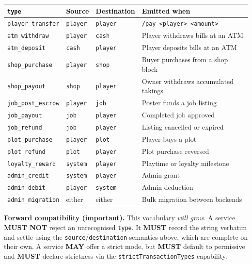 \documentclass[11pt,a4paper]{article}
\newcommand{\code}[1]{\texttt{\small #1}}
\newcommand{\req}{\textbf{MUST}}
\newcommand{\opt}{\textbf{MAY}}
\newcommand{\keybox}[2]{%
  \par\vspace{0.5em}\noindent
  \colorbox{#1}{%
    \begin{minipage}{\dimexpr\linewidth-2\fboxsep\relax}
    \vspace{0.35em}\small #2\vspace{0.35em}
    \end{minipage}}%
  \par\vspace{0.5em}}
\newcommand{\warn}[1]{\keybox{omceWarnWash}{#1}}
\begin{document}
\begin{tabularx}{\linewidth}{L{4.0cm} L{1.9cm} L{2.1cm} X}
\toprule
\code{type} & \textbf{Source} & \textbf{Destination} & \textbf{Emitted when}\\
\midrule
\code{player\_transfer}  & \code{player} & \code{player} & \code{/pay <player> <amount>}\\
\code{atm\_withdraw}     & \code{player} & \code{cash}   & Player withdraws bills at an ATM\\
\code{atm\_deposit}      & \code{cash}   & \code{player} & Player deposits bills at an ATM\\
\code{shop\_purchase}    & \code{player} & \code{shop}   & Buyer purchases from a shop block\\
\code{shop\_payout}      & \code{shop}   & \code{player} & Owner withdraws accumulated takings\\
\code{job\_post\_escrow} & \code{player} & \code{job}    & Poster funds a job listing\\
\code{job\_payout}       & \code{job}    & \code{player} & Completed job approved\\
\code{job\_refund}       & \code{job}    & \code{player} & Listing cancelled or expired\\
\code{plot\_purchase}    & \code{player} & \code{plot}   & Player buys a plot\\
\code{plot\_refund}      & \code{plot}   & \code{player} & Plot purchase reversed\\
\code{loyalty\_reward}   & \code{system} & \code{player} & Playtime or loyalty milestone\\
\code{admin\_credit}     & \code{system} & \code{player} & Admin grant\\
\code{admin\_debit}      & \code{player} & \code{system} & Admin deduction\\
\code{admin\_migration}  & either        & either        & Bulk migration between backends\\
\bottomrule
\end{tabularx}

\warn{\textbf{Forward compatibility (important).} This vocabulary \emph{will grow}. A service
\textbf{MUST NOT} reject an unrecognised \code{type}. It \req{} record the string verbatim and
settle using the \code{source}/\code{destination} semantics above, which are complete on their own.
A service \opt{} offer a strict mode, but \req{} default to permissive and \req{} declare
strictness via the \code{strictTransactionTypes} capability.}
\end{document}
